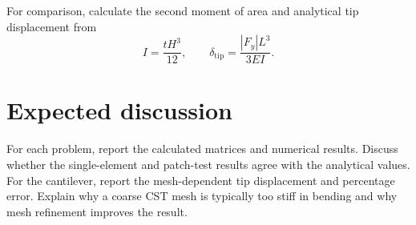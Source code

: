 \documentclass[12pt,a4paper]{article}
\begin{document}
For comparison, calculate the second moment of area and analytical tip
displacement from
\[
I=\frac{tH^3}{12},
\qquad
\delta_{\mathrm{tip}}
=\frac{|F_y|L^3}{3EI}.
\]

\section*{Expected discussion}

For each problem, report the calculated matrices and numerical results.
Discuss whether the single-element and patch-test results agree with the
analytical values. For the cantilever, report the mesh-dependent tip
displacement and percentage error. Explain why a coarse CST mesh is
typically too stiff in bending and why mesh refinement improves the result.
\end{document}
